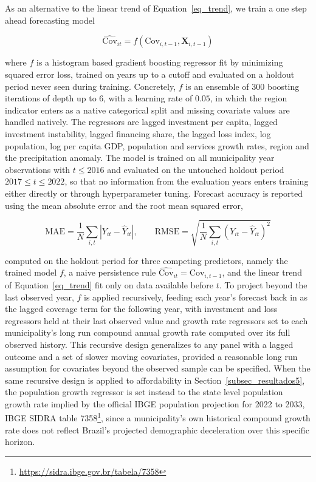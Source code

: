 \documentclass[pdflatex,sn-mathphys-num]{sn-jnl}%
\theoremstyle{thmstyleone}%
\theoremstyle{thmstyletwo}%
\theoremstyle{thmstylethree}%
\begin{document}
As an alternative to the linear trend of Equation~\eqref{eq_trend}, we train a one step ahead forecasting model

\begin{equation}
\widehat{\text{Cov}}_{it} = f\left(\text{Cov}_{i,t-1}, \mathbf{X}_{i,t-1}\right)
\label{eq_ml}
\end{equation}

where $f$ is a histogram based gradient boosting regressor fit by minimizing squared error loss, trained on years up to a cutoff and evaluated on a holdout period never seen during training. Concretely, $f$ is an ensemble of $300$ boosting iterations of depth up to $6$, with a learning rate of $0.05$, in which the region indicator enters as a native categorical split and missing covariate values are handled natively. The regressors are lagged investment per capita, lagged investment instability, lagged financing share, the lagged loss index, log population, log per capita GDP, population and services growth rates, region and the precipitation anomaly. The model is trained on all municipality year observations with $t \leq 2016$ and evaluated on the untouched holdout period $2017 \leq t \leq 2022$, so that no information from the evaluation years enters training either directly or through hyperparameter tuning. Forecast accuracy is reported using the mean absolute error and the root mean squared error,

\begin{equation}
\text{MAE} = \frac{1}{N}\sum_{i,t}\left|Y_{it}-\widehat{Y}_{it}\right|, \qquad
\text{RMSE} = \sqrt{\frac{1}{N}\sum_{i,t}\left(Y_{it}-\widehat{Y}_{it}\right)^{2}}
\label{eq_error}
\end{equation}

computed on the holdout period for three competing predictors, namely the trained model $f$, a naive persistence rule $\widehat{\text{Cov}}_{it}=\text{Cov}_{i,t-1}$, and the linear trend of Equation~\eqref{eq_trend} fit only on data available before $t$. To project beyond the last observed year, $f$ is applied recursively, feeding each year's forecast back in as the lagged coverage term for the following year, with investment and loss regressors held at their last observed value and growth rate regressors set to each municipality's long run compound annual growth rate computed over its full observed history. This recursive design generalizes to any panel with a lagged outcome and a set of slower moving covariates, provided a reasonable long run assumption for covariates beyond the observed sample can be specified. When the same recursive design is applied to affordability in Section~\ref{subsec_resultados5}, the population growth regressor is set instead to the state level population growth rate implied by the official IBGE population projection for 2022 to 2033, IBGE SIDRA table 7358\footnote{\url{https://sidra.ibge.gov.br/tabela/7358}}, since a municipality's own historical compound growth rate does not reflect Brazil's projected demographic deceleration over this specific horizon.
\end{document}
